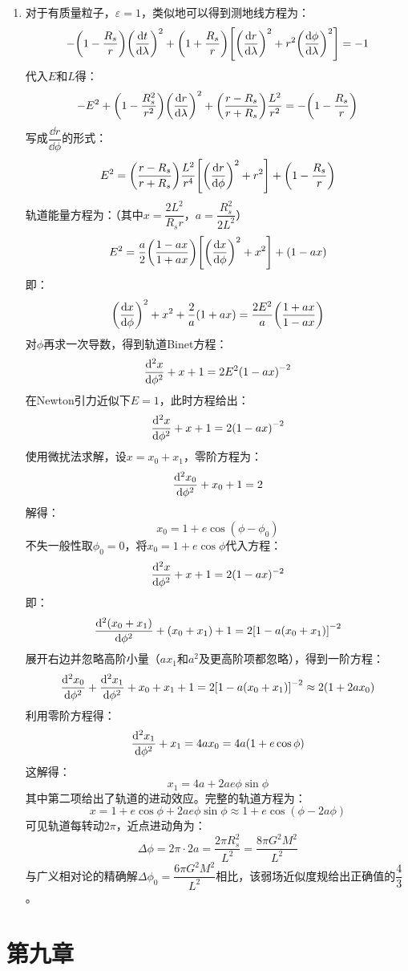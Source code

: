 \documentclass[a4paper]{article}
\begin{document}
\begin{enumerate}
    \item[15.(b)]
    对于有质量粒子，$\varepsilon = 1$，类似地可以得到测地线方程为：
    \[
        -\qty(1 - \frac{R_s}{r}) \qty(\dv{t}{\lambda})^2 + \qty(1 + \frac{R_s}{r}) \qty[\qty(\dv{r}{\lambda})^2 + r^2 \qty(\dv{\phi}{\lambda})^2] = -1
    \]
    代入$E$和$L$得：
    \[
        -E^2 + \qty(1 - \frac{R_s^2}{r^2}) \qty(\dv{r}{\lambda})^2 + \qty(\frac{r - R_s}{r + R_s}) \frac{L^2}{r^2} = -\qty(1 - \frac{R_s}{r})
    \]
    写成$\dfrac{\dd{r}}{\dd{\phi}}$的形式：
    \[
        E^2 = \qty(\frac{r - R_s}{r + R_s}) \frac{L^2}{r^4} \qty[\qty(\dv{r}{\phi})^2 + r^2] + \qty(1 - \frac{R_s}{r})
    \]
    轨道能量方程为：（其中$x = \dfrac{2L^2}{R_s r}$，$a = \dfrac{R_s^2}{2L^2}$）
    \[
        E^2 = \frac{a}{2} \qty(\frac{1 - ax}{1 + ax}) \qty[\qty(\dv{x}{\phi})^2 + x^2] + (1 - ax)
    \]
    即：
    \[
        \qty(\dv{x}{\phi})^2 + x^2 + \frac{2}{a}(1 + ax) = \frac{2E^2}{a} \qty(\frac{1 + ax}{1 - ax})
    \]
    对$\phi$再求一次导数，得到轨道Binet方程：
    \[
        \dv[2]{x}{\phi} + x + 1 = 2E^2 \qty(1 - ax)^{-2}
    \]
    在Newton引力近似下$E = 1$，此时方程给出：
    \[
        \dv[2]{x}{\phi} + x + 1 = 2 \qty(1 - ax)^{-2}
    \]
    使用微扰法求解，设$x = x_0 + x_1$，零阶方程为：
    \[
        \dv[2]{x_0}{\phi} + x_0 + 1 = 2
    \]
    解得：
    \[
        x_0 = 1 + e\cos(\phi - \phi_0)
    \]
    不失一般性取$\phi_0 = 0$，将$x_0 = 1 + e\cos{\phi}$代入方程：
    \[
        \dv[2]{x}{\phi} + x + 1 = 2 (1 - ax)^{-2}
    \]
    即：
    \[
        \dv[2]{(x_0 + x_1)}{\phi} + (x_0 + x_1) + 1 = 2 \qty[1 - a(x_0 + x_1)]^{-2}
    \]
    展开右边并忽略高阶小量（$ax_1$和$a^2$及更高阶项都忽略），得到一阶方程：
    \[
        \dv[2]{x_0}{\phi} + \dv[2]{x_1}{\phi} + x_0 + x_1 + 1 = 2 \qty[1 - a(x_0 + x_1)]^{-2} \approx 2 (1 + 2a x_0)
    \]
    利用零阶方程得：
    \[
        \dv[2]{x_1}{\phi} + x_1 = 4a x_0 = 4a (1 + e\cos{\phi})
    \]
    这解得：
    \[
        x_1 = 4a + 2ae\phi \sin{\phi}
    \]
    其中第二项给出了轨道的进动效应。完整的轨道方程为：
    \[
        x = 1 + e\cos{\phi} + 2ae\phi \sin{\phi} \approx 1 + e\cos(\phi - 2a\phi)
    \]
    可见轨道每转动$2\pi$，近点进动角为：
    \[
        \Delta\phi = 2\pi \cdot 2a = \frac{2\pi R_s^2}{L^2} = \frac{8\pi G^2 M^2}{L^2}
    \]
    与广义相对论的精确解$\Delta\phi_0 = \dfrac{6\pi G^2 M^2}{L^2}$相比，该弱场近似度规给出正确值的$\dfrac{4}{3}$。
\end{enumerate}

\clearpage
\section*{第九章}
\end{document}
